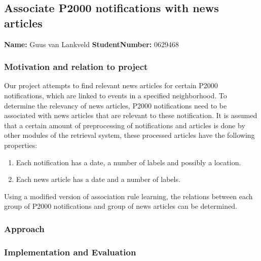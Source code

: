 \subsection{Associate P2000 notifications with news articles}
\textbf{Name:}  Guus van Lankveld \indent \textbf{StudentNumber:} 0629468

\subsubsection*{Motivation and relation to project}
Our project attempts to find relevant news articles for certain P2000 notifications, which are linked to events in a specified neighborhood. To determine the relevancy of news articles, P2000 notifications need to be associated with news articles that are relevant to these notification. It is assumed that a certain amount of preprocessing of notifications and articles is done by other modules of the retrieval system, these processed articles have the following properties:
\begin{enumerate}
\item Each notification has a date, a number of labels and possibly a location.
\item Each news article has a date and a number of labels.
\end{enumerate}
Using a modified version of association rule learning, the relations between each group of P2000 notifications and group of news articles can be determined.  

\subsubsection*{Approach}



\subsubsection*{Implementation and Evaluation }
